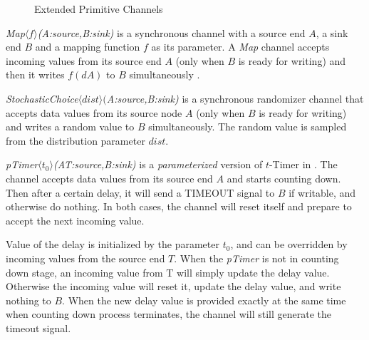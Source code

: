 \begin{figure}[t]
    \centering
    \label{fig:newchannels}
    
    \caption{Extended Primitive Channels}
\end{figure}

\begin{description}
    \item \emph{Map$\langle f\rangle$(A:source,B:sink)}
        is a synchronous channel with a source end $A$, a sink end $B$ and a mapping function $f$ as its parameter. 
        A \emph{Map} channel accepts incoming values from its source end $A$ (only when $B$ is ready for writing) and then it writes $f(dA)$ to $B$ simultaneously .
    
    \item \emph{StochasticChoice$\langle dist\rangle($A:source,B:sink)} is a synchronous randomizer channel that accepts data values from its source node $A$ (only when $B$ is ready for writing) and writes a random value to $B$ simultaneously. The random value is sampled from the distribution parameter $dist$.
    
    \item \emph{pTimer$\langle t_0\rangle$(A\:T:source,B:sink)} is a \emph{parameterized} version of $t$-Timer in \cite{Meng2012}. 
        The channel accepts data values from its source end $A$ and starts counting down. Then after a certain delay, it will send a TIMEOUT signal to $B$ if writable, and otherwise do nothing. In both cases, the channel will reset itself and prepare to accept the next incoming value.
        
        Value of the delay is initialized by the parameter $t_0$, and can be overridden by incoming values from the source end $T$. When the \emph{pTimer} is not in counting down stage, an incoming value from T will simply update the delay value. Otherwise the incoming value will reset it, update the delay value, and write nothing to $B$. When the new delay value is provided exactly at the same time when counting down process terminates, the channel will still generate the timeout signal.

\end{description}


